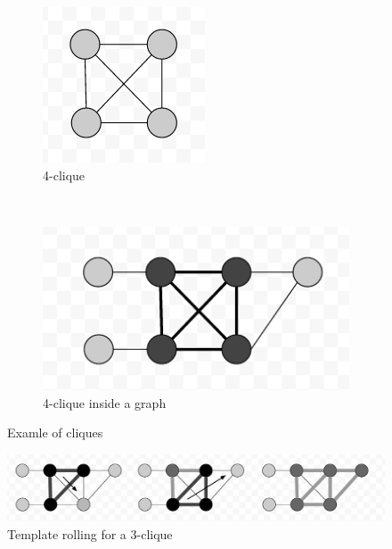 \documentclass[runningheads,a4paper]{llncs}
\begin{document}
\begin{figure}
\begin{subfigure}[b]{0.3\textwidth}
        \includegraphics[width=\textwidth]{4-clique}
        \caption{4-clique}
        \label{fig:4clique}
    \end{subfigure}
    ~ %
    \begin{subfigure}[b]{0.3\textwidth}
        \includegraphics[width=\textwidth]{cliqueinside}
        \caption{4-clique inside a graph}
        \label{fig:cliqueInside}
    \end{subfigure}
    \caption{Examle of cliques}\label{fig:cliques}
\end{figure}

\begin{figure}
	\includegraphics[width=\textwidth]{rolling.png}
	\caption{Template rolling for a $3$-clique}
	\label{fig:rolling}
\end{figure}
\end{document}
